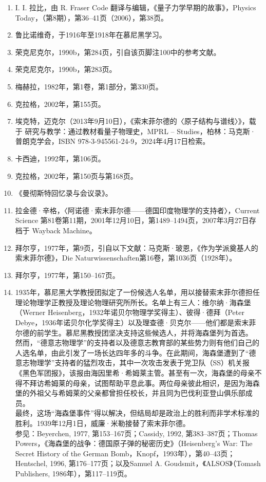 \begin{enumerate}
\item I. I. 拉比，由 R. Fraser Code 翻译与编辑，《量子力学早期的故事》，Physics Today，（第8期），第36–41页（2006），第38页。
\item 鲁比诺维奇，于1916年至1918年在慕尼黑学习。
\item 荣克尼克尔，1990b，第284页，引自该页脚注100中的参考文献。
\item 荣克尼克尔，1990b，第283页。
\item 梅赫拉，1982年，第1卷，第1部分，第330页。
\item 克拉格，2002年，第155页。
\item 埃克特，迈克尔（2013年9月10日），《索末菲尔德的〈原子结构与谱线〉》，载于 研究与教学：通过教材看量子物理史，MPRL – Studies，柏林：马克斯·普朗克学会，ISBN 978-3-945561-24-9，2024年4月17日检索。
\item 卡西迪，1992年，第106页。
\item 克拉格，2002年，第150页与第168页。
\item 《曼彻斯特回忆录与会议录》。
\item 拉金德·辛格，〈阿诺德·索末菲尔德——德国印度物理学的支持者〉，Current Science 第81卷第11期，2001年12月10日，第1489–1494页，2007年3月27日存档于 Wayback Machine。
\item 拜尔亨，1977年，第9页，引自以下文献：马克斯·玻恩，《作为学派奠基人的索末菲尔德》，Die Naturwissenschaften第16卷，第1036页（1928年）。
\item 拜尔亨，1977年，第150–167页。
\item 1935年，慕尼黑大学教授团拟定了一份候选人名单，用以接替索末菲尔德担任理论物理学正教授及理论物理研究所所长。名单上有三人：维尔纳·海森堡（Werner Heisenberg，1932年诺贝尔物理学奖得主）、彼得·德拜（Peter Debye，1936年诺贝尔化学奖得主）以及理查德·贝克尔——他们都是索末菲尔德的前学生。慕尼黑教授团坚决支持这些候选人，并将海森堡列为首选。\\
然而，“德意志物理学”的支持者以及德意志教育部的某些势力则有他们自己的人选名单，由此引发了一场长达四年多的斗争。在此期间，海森堡遭到了“德意志物理学”支持者的猛烈攻击，其中一次攻击发表于党卫队（SS）机关报《黑色军团报》，该报由海因里希·希姆莱主管。甚至有一次，海森堡的母亲不得不拜访希姆莱的母亲，试图帮助平息此事。两位母亲彼此相识，是因为海森堡的外祖父与希姆莱的父亲都曾担任校长，并且同为巴伐利亚登山俱乐部成员。\\
最终，这场“海森堡事件”得以解决，但结局却是政治上的胜利而非学术标准的胜利。1939年12月1日，威廉·米勒接替了索末菲尔德。\\
参见：Beyerchen, 1977, 第153–167页；Cassidy, 1992, 第383–387页；Thomas Powers，《海森堡的战争：德国原子弹的秘密历史》（Heisenberg's War: The Secret History of the German Bomb，Knopf，1993年），第40–43页；Hentschel, 1996, 第176–177页；以及Samuel A. Goudsmit，《ALSOS》（Tomash Publishers, 1986年），第117–119页。


\end{enumerate}
